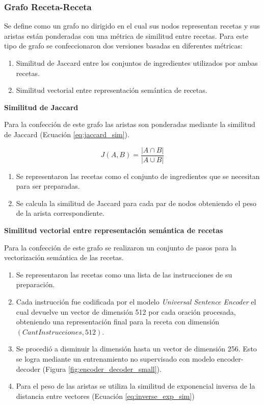 \documentclass[
	a4paper, %
	10pt, %
	unnumberedsections, %
	twoside, %
]{LTJournalArticle}
\begin{document}
\subsubsection{Grafo Receta-Receta}

Se define como un grafo no dirigido en el cual sus nodos representan recetas y sus aristas
están ponderadas con una métrica de similitud entre recetas. Para este tipo de grafo se confeccionaron dos 
versiones basadas en diferentes métricas:

\begin{enumerate}
	\item Similitud de Jaccard entre los conjuntos de ingredientes utilizados por ambas recetas.
	\item Similitud vectorial entre representación semántica de recetas.
\end{enumerate}

\textbf{Similitud de Jaccard}

Para la confección de este grafo las aristas son ponderadas mediante la similitud de Jaccard (Ecuación \ref{eq:jaccard_sim}).

\begin{equation}
	J(A, B) = \frac{|A \cap B|}{|A \cup B|}
	\label{eq:jaccard_sim}
\end{equation}

\begin{enumerate}
	\item Se representaron las recetas como el conjunto de ingredientes que se necesitan para ser preparadas.
	\item Se calcula la similitud de Jaccard para cada par de nodos obteniendo el peso de la arista correspondiente.
\end{enumerate}

\textbf{Similitud vectorial entre representación semántica de recetas}

Para la confección de este grafo se realizaron un conjunto de pasos para la vectorización semántica de las recetas.

\begin{enumerate}
	\item Se representaron las recetas como una lista de las instrucciones de su preparación.
	\item Cada instrucción fue codificada por el modelo \textit{Universal Sentence Encoder} \autocite{Smith:2023qr}
	el cual devuelve un vector de dimensión 512 por cada oración procesada, obteniendo una representación final
	para la receta con dimensión $(CantInstrucciones, 512)$. 
	\item Se procedió a disminuir la dimensión hasta un vector de dimensión 256. Esto se logra mediante un 
	entrenamiento no supervisado con modelo encoder-decoder (Figura \ref{fig:encoder_decoder_small}).
	\item Para el peso de las aristas se utiliza la similitud de exponencial inversa de la distancia entre vectores 
	(Ecuación \ref{eq:inverse_exp_sim})
\end{enumerate}
\end{document}
